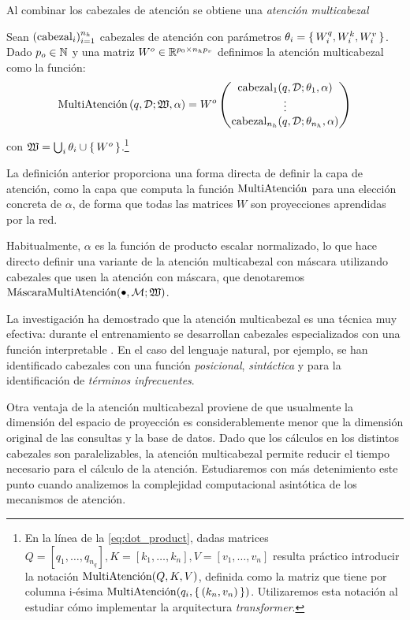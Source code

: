 Al combinar los cabezales de atención se obtiene una \textit{atención multicabezal}
\begin{definition}     
     Sean \( (\operatorname{cabezal}_{i})_{i = 1}^{n_h} \) cabezales de atención con parámetros \( \theta_{i} = \{\, W^q_{i}, W^k_{i}, W^v_{i} \,\} \). Dado \( p_o \in \mathbb{N} \) y una matriz \( W^o \in \mathbb{R}^{p_0 \times n_h p_v} \) definimos la atención multicabezal como la función:
     \[
        \operatorname{MultiAtenci\acute{o}n} \left(q, \mathcal{D}; \mathfrak{W}, \alpha \right) = W^o \begin{pmatrix} \operatorname{cabezal}_{1}(q, \mathcal{D}; \theta_{1}, \alpha) \\ \vdots \\ \operatorname{cabezal}_{n_h}(q, \mathcal{D}; \theta_{n_h}, \alpha) \end{pmatrix}
     \]
     con \( \mathfrak{W} = \bigcup_i \theta_i \cup \{\,W^o\,\} \).\footnote{En la línea de la \cref{eq:dot_product}, dadas matrices \( Q = [q_1, …, q_{n_q}], K = [k_1, …, k_n], V = [v_1, …, v_n] \) resulta práctico introducir la notación \( \operatorname{MultiAtenci\acute{o}n}(Q, K, V) \), definida como la matriz que tiene por columna i-ésima \( \operatorname{MultiAtenci\acute{o}n}(q_i, \{\,(k_n, v_n)\,\}) \). Utilizaremos esta notación al estudiar cómo implementar la arquitectura \textit{transformer}.}
\end{definition}

La definición anterior proporciona una forma directa de definir la capa de atención, como la capa que computa la función \( \operatorname{MultiAtenci\acute{o}n} \) para una elección concreta de \( \alpha \), de forma que todas las matrices \( W \) son proyecciones aprendidas por la red. 

Habitualmente, \( \alpha \) es la función de producto escalar normalizado, lo que hace directo definir una variante de la atención multicabezal con máscara utilizando cabezales que usen la atención con máscara, que denotaremos \( \mmultihead(\smallbullet, \mathcal{M}; \mathfrak{W}) \). 

La investigación ha demostrado que la atención multicabezal es una técnica muy efectiva: durante el entrenamiento se desarrollan cabezales especializados con una función interpretable \cite{voita2019analyzing}. En el caso del lenguaje natural, por ejemplo, se han identificado cabezales con una función \textit{posicional}, \textit{sintáctica} y para la identificación de \textit{términos infrecuentes}.

Otra ventaja de la atención multicabezal proviene de que usualmente la dimensión del espacio de proyección es considerablemente menor que la dimensión original de las consultas y la base de datos. Dado que los cálculos en los distintos cabezales son paralelizables, la atención multicabezal permite reducir el tiempo necesario para el cálculo de la atención. Estudiaremos con más detenimiento este punto cuando analizemos la complejidad computacional asintótica de los mecanismos de atención.

